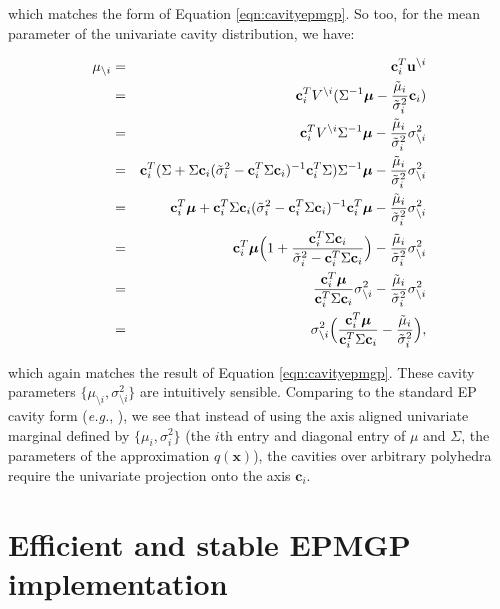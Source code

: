 \documentclass[twoside,11pt]{article}
\def\x{{\mathbf x}}
\def\c{{\mathbf c}}
\def\u{{\mathbf u}}
\def\boldmu{\bm{\mu}}
\newcommand{\wo}{\setminus}
\begin{document}
\noindent which matches the form of Equation \ref{eqn:cavityepmgp}.  So too, for the mean parameter of the univariate cavity distribution, we have:

\begin{eqnarray}
\mu_{\wo i} & = & \c_i^T\u^{\backslash i} \\
& = & \c_i^TV^{\backslash i}(\Sigma^{-1}\boldmu  - \frac{\tilde{\mu}_i}{\tilde{\sigma}_i^2} \c_i) \\
& = & \c_i^TV^{\backslash i}\Sigma^{-1}\boldmu - \frac{\tilde{\mu}_i}{\tilde{\sigma}_i^2} \sigma_{\wo i}^2 \\
& = & \c_i^T(\Sigma + \Sigma \c_i ( \tilde{\sigma}_i^{2}  - \c_i^T \Sigma \c_i )^{-1} \c_i^T \Sigma) \Sigma^{-1}\boldmu  - \frac{\tilde{\mu}_i}{\tilde{\sigma}_i^2} \sigma_{\wo i}^2  \\
& = & \c_i^T\boldmu + \c_i^T\Sigma \c_i ( \tilde{\sigma}_i^{2}  - \c_i^T \Sigma \c_i )^{-1} \c_i^T\boldmu - \frac{\tilde{\mu}_i}{\tilde{\sigma}_i^2} \sigma_{\wo i}^2 \\
& = & \c_i^T\boldmu\Bigl( 1 +  \frac{ \c_i^T \Sigma \c_i }{ \tilde{\sigma}_i^{2}  - \c_i^T \Sigma \c_i }\Bigr) - \frac{\tilde{\mu}_i}{\tilde{\sigma}_i^2} \sigma_{\wo i}^2\\
& = & \frac{\c_i^T\boldmu}{\c_i^T\Sigma\c_i} \sigma_{\wo i}^2 - \frac{\tilde{\mu}_i}{\tilde{\sigma}_i^2} \sigma_{\wo i}^2\\
& = & \sigma_{\wo i}^2 \Bigl( \frac{\c_i^T\boldmu}{\c_i^T\Sigma\c_i} - \frac{\tilde{\mu}_i}{\tilde{\sigma}_i^2} \Bigr),
\end{eqnarray}

\noindent which again matches the result of Equation \ref{eqn:cavityepmgp}.  These cavity parameters $\{\mu_{\wo i},\sigma_{\wo i}^2\}$ are intuitively sensible.  Comparing to the standard EP cavity form ({\it e.g.}, \cite{rasmussenBook}), we see that instead of using the axis aligned univariate marginal defined by $\{\mu_i,\sigma^2_i\}$ (the $i$th entry and diagonal entry of $\mu$ and $\Sigma$, the parameters of the approximation $q(\x)$), the cavities over arbitrary polyhedra require the univariate projection onto the axis $\c_i$.


\newpage



\section{Efficient and stable EPMGP implementation}
\label{sec:epmgpstable}
\end{document}
